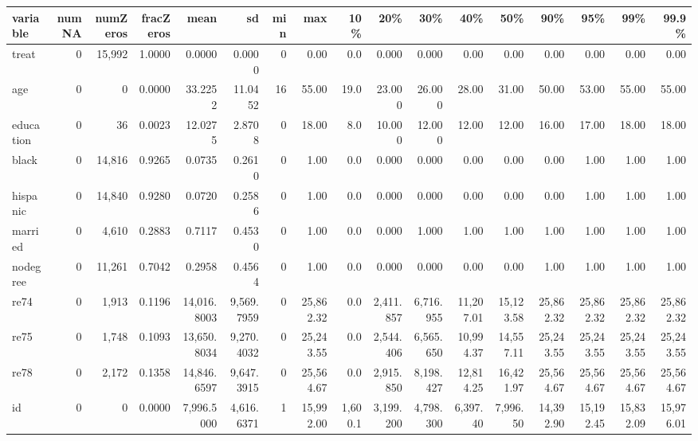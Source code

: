 
\begin{tabular}{lrrrrrrrrrrrrrrrr}
\toprule
variable & numNA & numZeros & fracZeros & mean & sd & min & max & 10\% & 20\% & 30\% & 40\% & 50\% & 90\% & 95\% & 99\% & 99.9\%\\
\midrule
treat & 0 & 15,992 & 1.0000 & 0.0000 & 0.0000 & 0 & 0.00 & 0.0 & 0.000 & 0.000 & 0.00 & 0.00 & 0.00 & 0.00 & 0.00 & 0.00\\
age & 0 & 0 & 0.0000 & 33.2252 & 11.0452 & 16 & 55.00 & 19.0 & 23.000 & 26.000 & 28.00 & 31.00 & 50.00 & 53.00 & 55.00 & 55.00\\
education & 0 & 36 & 0.0023 & 12.0275 & 2.8708 & 0 & 18.00 & 8.0 & 10.000 & 12.000 & 12.00 & 12.00 & 16.00 & 17.00 & 18.00 & 18.00\\
black & 0 & 14,816 & 0.9265 & 0.0735 & 0.2610 & 0 & 1.00 & 0.0 & 0.000 & 0.000 & 0.00 & 0.00 & 0.00 & 1.00 & 1.00 & 1.00\\
hispanic & 0 & 14,840 & 0.9280 & 0.0720 & 0.2586 & 0 & 1.00 & 0.0 & 0.000 & 0.000 & 0.00 & 0.00 & 0.00 & 1.00 & 1.00 & 1.00\\
\addlinespace
married & 0 & 4,610 & 0.2883 & 0.7117 & 0.4530 & 0 & 1.00 & 0.0 & 0.000 & 1.000 & 1.00 & 1.00 & 1.00 & 1.00 & 1.00 & 1.00\\
nodegree & 0 & 11,261 & 0.7042 & 0.2958 & 0.4564 & 0 & 1.00 & 0.0 & 0.000 & 0.000 & 0.00 & 0.00 & 1.00 & 1.00 & 1.00 & 1.00\\
re74 & 0 & 1,913 & 0.1196 & 14,016.8003 & 9,569.7959 & 0 & 25,862.32 & 0.0 & 2,411.857 & 6,716.955 & 11,207.01 & 15,123.58 & 25,862.32 & 25,862.32 & 25,862.32 & 25,862.32\\
re75 & 0 & 1,748 & 0.1093 & 13,650.8034 & 9,270.4032 & 0 & 25,243.55 & 0.0 & 2,544.406 & 6,565.650 & 10,994.37 & 14,557.11 & 25,243.55 & 25,243.55 & 25,243.55 & 25,243.55\\
re78 & 0 & 2,172 & 0.1358 & 14,846.6597 & 9,647.3915 & 0 & 25,564.67 & 0.0 & 2,915.850 & 8,198.427 & 12,814.25 & 16,421.97 & 25,564.67 & 25,564.67 & 25,564.67 & 25,564.67\\
\addlinespace
id & 0 & 0 & 0.0000 & 7,996.5000 & 4,616.6371 & 1 & 15,992.00 & 1,600.1 & 3,199.200 & 4,798.300 & 6,397.40 & 7,996.50 & 14,392.90 & 15,192.45 & 15,832.09 & 15,976.01\\
\bottomrule
\end{tabular}
